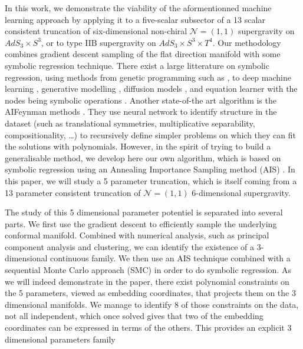 \documentclass[11pt]{article}
\begin{document}
In this work, we demonstrate the viability of the aformentionned machine learning approach by applying it to a five-scalar subsector of a 13 scalar consistent truncation of six-dimensional non-chiral $\mathcal{N} = (1,1)$ supergravity on $AdS_3 \times S^3$, or to type IIB supergravity on $AdS_3 \times S^3 \times T^4$. Our methodology combines gradient descent sampling of the flat direction manifold with some symbolic regression technique. There exist a large litterature on symbolic regression, using methods from genetic programming \cite{koza1994genetic} such as \cite{virgolin2021improving,randall2022bingo,burlacu2019parsimony}, to deep machine learning \cite{petersen2019deep,kamienny2022end}, generative modelling \cite{valipour2021symbolicgpt}, diffusion models \cite{bastiani2025diffusion}, and equation learner with the nodes being symbolic operations \cite{2018arXiv180607259S}. Another state-of-the art algorithm is the AIFeynman methods \cite{Udrescu:2019mnk}. They use neural network to identify structure in the dataset (such as translational symmetries, multiplicative separability, compositionality, \dots) to recursively define simpler problems on which they can fit the solutions with polynomials.  However, in the spirit of trying to build a generalisable method, we develop here our own algorithm, which is based on symbolic regression using an Annealing Importance Sampling method (AIS) \cite{neal1998annealedimportancesampling}. In this paper, we will study a 5 parameter truncation, which is itself coming from a 13 parameter consistent truncation of $\mathcal{N} = (1,1)$ 6-dimensional supergravity. 

The study of this 5 dimensional parameter potentiel is separated into several parts. We first use the gradient descent to efficiently sample the underlying conformal manifold. Combined with numerical analysis, such as principal component analysis and clustering, we can identify the existence of a 3-dimensional continuous family. We then use an AIS technique combined with a sequential Monte Carlo approach (SMC) \cite{del2006sequential} in order to do symbolic regression. As we will indeed demonstrate in the paper, there exist polynomial constraints on the 5 parameters, viewed as embedding coordinates, that projects them on the 3 dimensional manifolds. We manage to identify 8 of those constraints on the data, not all independent, which once solved gives that two of the embedding coordinates can be expressed in terms of the others. This provides an explicit 3 dimensional parameters family 
\end{document}
